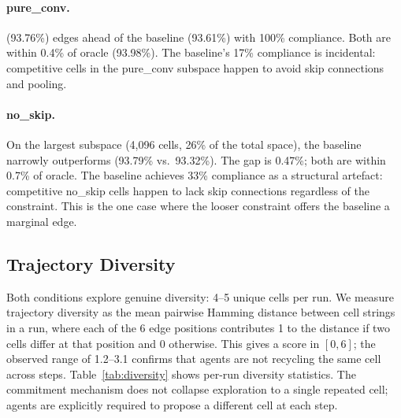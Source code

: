\paragraph{pure\_conv.}
\haas{} (93.76\%) edges ahead of the baseline (93.61\%) with 100\% compliance.
Both are within 0.4\% of oracle (93.98\%). The baseline's 17\% compliance is
incidental: competitive cells in the pure\_conv subspace happen to avoid skip
connections and pooling.

\paragraph{no\_skip.}
On the largest subspace (4,096 cells, 26\% of the total space), the baseline
narrowly outperforms \haas{} (93.79\% vs.\ 93.32\%). The gap is 0.47\%;
both are within 0.7\% of oracle. The baseline achieves 33\% compliance as a
structural artefact: competitive no\_skip cells happen to lack skip connections
regardless of the constraint. This is the one case where the looser constraint
offers the baseline a marginal edge.

\subsection{Trajectory Diversity}
\label{sec:phase2-diversity}

Both conditions explore genuine diversity: 4--5 unique cells per run.
We measure trajectory diversity as the mean pairwise Hamming distance between
cell strings in a run, where each of the 6 edge positions contributes 1 to the
distance if two cells differ at that position and 0 otherwise. This gives a
score in $[0, 6]$; the observed range of 1.2--3.1 confirms that agents are not
recycling the same cell across steps. Table~\ref{tab:diversity} shows per-run diversity
statistics. The commitment mechanism does not collapse exploration to a
single repeated cell; agents are explicitly required to propose a different
cell at each step.

